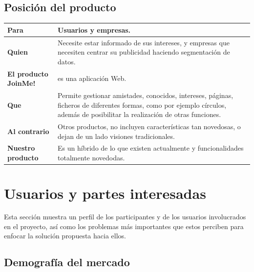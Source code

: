 \documentclass[12pt, a4paper, titlepage]{article}
\begin{document}
\subsection{Posición del producto}


\begin{center}
	\begin{tabular}{| p{4cm} | p{11cm} |}
 		\hline
		\textbf{Para} & Usuarios y empresas. \\ \hline
		\textbf{Quien} & Necesite estar informado de sus intereses, y empresas que necesiten centrar su publicidad haciendo segmentación de datos.\\ \hline	
		\textbf{El producto \textbf{JoinMe!}} & es una aplicación Web. \\ \hline	
		\textbf{Que} & Permite gestionar amistades, conocidos, intereses, páginas, ficheros de diferentes formas, como por ejemplo círculos, además de posibilitar la realización de otras funciones.\\ \hline
		\textbf{Al contrario} & Otros productos, no incluyen características tan novedosas, o dejan de un lado visiones tradicionales.\\ \hline	    	
		\textbf{Nuestro producto} & Es un híbrido de lo que existen actualmente y funcionalidades totalmente novedodas.\\ \hline	    						
	\end{tabular}
\end{center}


\section{Usuarios y partes interesadas}

Esta sección muestra un perfil de los participantes y de los usuarios involucrados en
el proyecto, así como los problemas más importantes que estos perciben para enfocar la
solución propuesta hacia ellos.


\subsection{Demografía del mercado}
\end{document}
